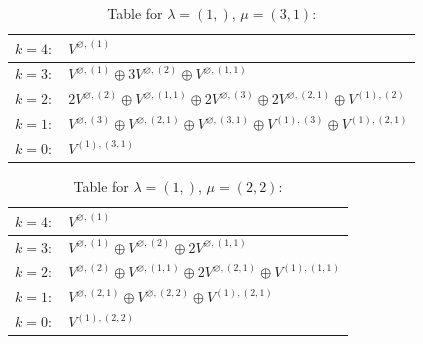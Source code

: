 \documentclass[a4paper,12pt]{article}
\begin{document}
\renewcommand{\arraystretch}{1.6} 
\begin{table}[H]
\centering
\caption{Table for $\lambda = (1,)$, $\mu = (3, 1)$:}
\begin{tabular}{|>{\centering\arraybackslash}p{15cm}|}
\hline
 $k = 4: \quad V^{\varnothing, (1)} $ \\ \hline
 $k = 3: \quad V^{\varnothing, (1)} \oplus 3 V^{\varnothing, (2)} \oplus V^{\varnothing, (1, 1)} $ \\ \hline
 $k = 2: \quad 2 V^{\varnothing, (2)} \oplus V^{\varnothing, (1, 1)} \oplus 2 V^{\varnothing, (3)} \oplus 2 V^{\varnothing, (2, 1)} \oplus V^{(1), (2)} $ \\ \hline
 $k = 1: \quad V^{\varnothing, (3)} \oplus V^{\varnothing, (2, 1)} \oplus V^{\varnothing, (3, 1)} \oplus V^{(1), (3)} \oplus V^{(1), (2, 1)} $ \\ \hline
 $k = 0: \quad V^{(1), (3, 1)} $ \\ \hline
\end{tabular}
\end{table}

\renewcommand{\arraystretch}{1.6} 
\begin{table}[H]
\centering
\caption{Table for $\lambda = (1,)$, $\mu = (2, 2)$:}
\begin{tabular}{|>{\centering\arraybackslash}p{15cm}|}
\hline
 $k = 4: \quad V^{\varnothing, (1)} $ \\ \hline
 $k = 3: \quad V^{\varnothing, (1)} \oplus V^{\varnothing, (2)} \oplus 2 V^{\varnothing, (1, 1)} $ \\ \hline
 $k = 2: \quad V^{\varnothing, (2)} \oplus V^{\varnothing, (1, 1)} \oplus 2 V^{\varnothing, (2, 1)} \oplus V^{(1), (1, 1)} $ \\ \hline
 $k = 1: \quad V^{\varnothing, (2, 1)} \oplus V^{\varnothing, (2, 2)} \oplus V^{(1), (2, 1)} $ \\ \hline
 $k = 0: \quad V^{(1), (2, 2)} $ \\ \hline
\end{tabular}
\end{table}
\end{document}

